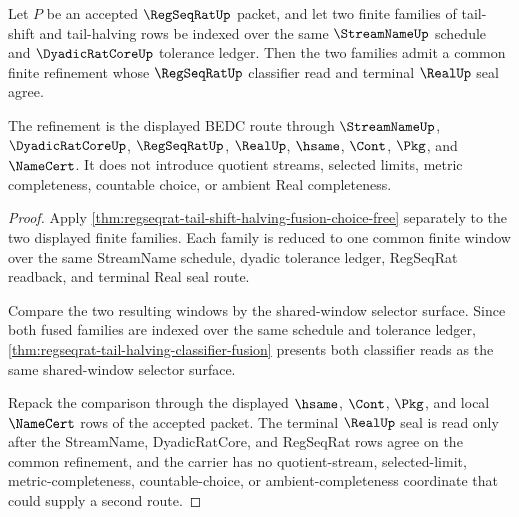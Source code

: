 \begin{theorem}
\label{thm:regseqrat-tail-halving-common-refinement}
Let $P$ be an accepted $\RegSeqRatUp$ packet, and let two finite families of tail-shift and tail-halving rows be indexed over the same $\StreamNameUp$ schedule and $\DyadicRatCoreUp$ tolerance ledger. Then the two families admit a common finite refinement whose $\RegSeqRatUp$ classifier read and terminal $\RealUp$ seal agree.

The refinement is the displayed BEDC route through $\StreamNameUp$, $\DyadicRatCoreUp$, $\RegSeqRatUp$, $\RealUp$, $\hsame$, $\Cont$, $\Pkg$, and $\NameCert$. It does not introduce quotient streams, selected limits, metric completeness, countable choice, or ambient Real completeness.
\end{theorem}
\begin{proof}
Apply \autoref{thm:regseqrat-tail-shift-halving-fusion-choice-free} separately to the two displayed finite families. Each family is reduced to one common finite window over the same StreamName schedule, dyadic tolerance ledger, RegSeqRat readback, and terminal Real seal route.

Compare the two resulting windows by the shared-window selector surface. Since both fused families are indexed over the same schedule and tolerance ledger, \autoref{thm:regseqrat-tail-halving-classifier-fusion} presents both classifier reads as the same shared-window selector surface.

Repack the comparison through the displayed $\hsame$, $\Cont$, $\Pkg$, and local $\NameCert$ rows of the accepted packet. The terminal $\RealUp$ seal is read only after the StreamName, DyadicRatCore, and RegSeqRat rows agree on the common refinement, and the carrier has no quotient-stream, selected-limit, metric-completeness, countable-choice, or ambient-completeness coordinate that could supply a second route.
\end{proof}
